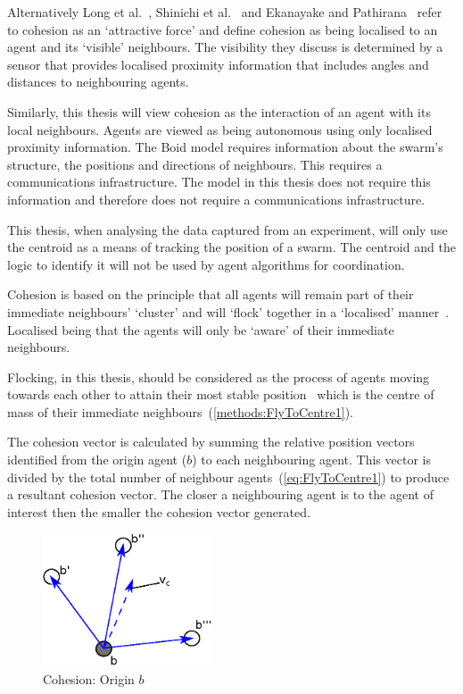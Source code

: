 Alternatively Long et al.~\cite{QZYP:13}, Shinichi et al.~\cite{AYSH:08} and Ekanayake and Pathirana~\cite{EP:10} refer to cohesion as an `attractive force' and define cohesion as being localised to an agent and its `visible' neighbours. The visibility they discuss is determined by a sensor that provides localised proximity information that includes angles and distances to neighbouring agents.
 
Similarly, this thesis will view cohesion as the interaction of an agent with its local neighbours. Agents are viewed as being autonomous using only localised proximity information. The Boid model requires information about the swarm's structure, the positions and directions of neighbours. This requires a communications infrastructure. The model in this thesis does not require this information and therefore does not require a communications infrastructure.

This thesis, when analysing the data captured from an experiment, will only use the centroid as a means of tracking the position of a swarm. The centroid and the logic to identify it will not be used by agent algorithms for coordination. 

Cohesion is based on the principle that all agents will remain part of their immediate neighbours' `cluster' and will `flock' together in a `localised' manner~\cite{VGHHDM:15, BAF:06, BAFVM:06, BFV:07, BM:09, HAY:08, HCS:09}. Localised being that the agents will only be `aware' of their immediate neighbours. 

Flocking, in this thesis, should be considered as the process of agents moving towards each other to attain their most stable position~\cite{GMJ:11, IGMFM:08} which is the centre of mass of their immediate neighbours~(\autoref{methods:FlyToCentre1}). 

The cohesion vector is calculated by summing the relative position vectors identified from the origin agent ($b$) to each neighbouring agent. This vector is divided by the total number of neighbour agents~(\autoref{eq:FlyToCentre1}) to produce a resultant cohesion vector. The closer a neighbouring agent is to the agent of interest then the smaller the cohesion vector generated.

\begin{figure}[H]
\begin{center}
\includegraphics[width=5cm]{CHAPTER-2/figures/FlyToCentre1}
\end{center}
\caption{Cohesion: Origin $b$ \label{methods:FlyToCentre1}}
\end{figure}

